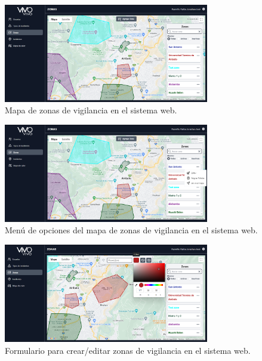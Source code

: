 \begin{figure}[H]
    \centering
    \includegraphics[width=0.8\textwidth]{chapters/III-resultados-y-discusion/resources/images/mapa-zonas-vigilancia-web.png}
    \caption{Mapa de zonas de vigilancia en el sistema web.}
    \label{fig:mapa-zonas-vigilancia-web}
\end{figure}

\begin{figure}[H]
    \centering
    \includegraphics[width=0.8\textwidth]{chapters/III-resultados-y-discusion/resources/images/menu-mapa-zonas-vigilancia-web.png}
    \caption{Menú de opciones del mapa de zonas de vigilancia en el sistema web.}
    \label{fig:menu-mapa-zonas-vigilancia-web}
\end{figure}

\begin{figure}[H]
    \centering
    \includegraphics[width=0.8\textwidth]{chapters/III-resultados-y-discusion/resources/images/formulario-zona-vigilancia-web.png}
    \caption{Formulario para crear/editar zonas de vigilancia en el sistema web.}
    \label{fig:formulario-zona-vigilancia-web}
\end{figure}


